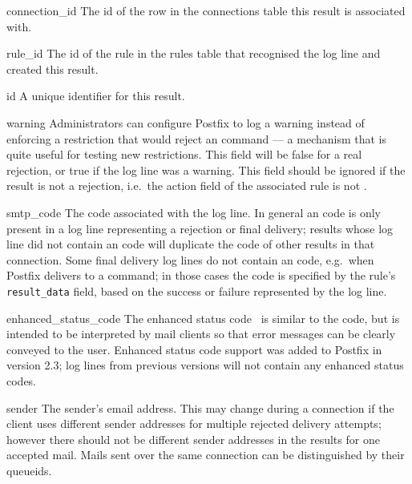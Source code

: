 \begin{boldeqlist}

    \item [connection\_id] The id of the row in the connections table this
        result is associated with.

    \item [rule\_id] The id of the rule in the rules table that recognised
        the log line and created this result.

    \item [id] A unique identifier for this result.

    \item [warning] Administrators can configure Postfix to log a warning
        instead of enforcing a restriction that would reject an
         command --- a mechanism that is quite useful for
        testing new restrictions.  This field will be false for a real
        rejection, or true if the log line was a warning.  This field
        should be ignored if the result is not a rejection, i.e.\ the
        action field of the associated rule is not
        .

    \item [smtp\_code] The  code associated with the log
        line.  In general an  code is only present in a log
        line representing a rejection or final delivery; results whose log
        line did not contain an  code will duplicate the
         code of other results in that connection.  Some
        final delivery log lines do not contain an  code,
        e.g.\ when Postfix delivers to a command; in those cases the
         code is specified by the rule's
        \texttt{result\_data} field, based on the success or failure
        represented by the log line.

    \item [enhanced\_status\_code] The enhanced status code~\cite{RFC3463}
        is similar to the  code, but is intended to be
        interpreted by mail clients so that error messages can be clearly
        conveyed to the user.  Enhanced status code support was added to
        Postfix in version 2.3; log lines from previous versions will not
        contain any enhanced status codes.

    \item [sender] The sender's email address.  This may change during a
        connection if the client uses different sender addresses for
        multiple rejected delivery attempts; however there should not be
        different sender addresses in the results for one accepted mail.
        Mails sent over the same connection can be distinguished by their
        queueids.


\end{boldeqlist}
